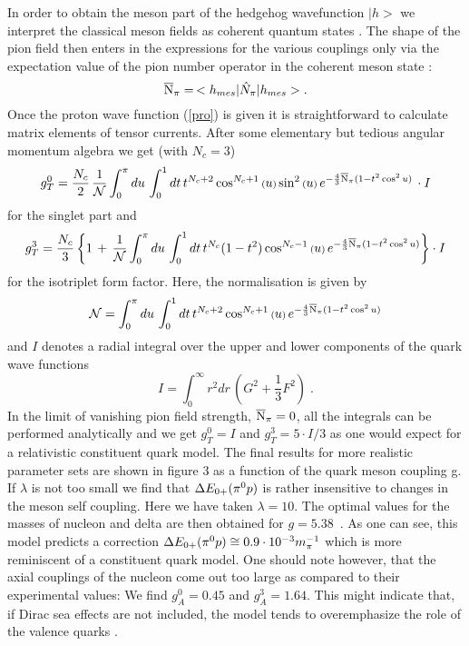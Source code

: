 In order to obtain the meson part of the hedgehog wavefunction
$|h>$ we interpret the classical meson fields as coherent quantum 
states \cite{Bi2}. The shape of the pion field then enters in the 
expressions for the various couplings only via the expectation value of the 
pion number operator in the coherent meson state \cite{Sch} :
\begin{equation}
\label{Npi}
\overline{{\rm N}}_{\pi} =\, <h_{mes}|\hat{N}_{\pi}|h_{mes}>.
\end{equation}
Once the proton wave function (\ref{pro}) is given it is straightforward to
calculate matrix elements of tensor currents. After some elementary but
tedious angular momentum algebra we get (with $N_c=3$)
\newcommand{\kl}{\scriptstyle}
\begin{equation}
\label{G1L}
g_T^{0} = \frac{N_c}{2}\,\frac{1}{{\cal N}}
\int_0^{\pi}du\,\int_0^1 dt\,t^{N_c +2}\cos^{N_c +1}{\kl (}u{\kl )}\sin^2
{\kl (}u{\kl )}
\,e^{-\frac{4}{3}\overline{{\rm N}}_{\pi}(1-t^2 \cos^2 u)}\,\cdot I
\end{equation}
for the singlet part and 
\begin{equation}
\label{G3L}
g_T^{3} =  \frac{N_c}{3} \left\{ 1\,+\, \frac{1}{{\cal N}}
\int_0^{\pi} du\, \int_0^1 dt\, t^{N_c}(1-t^2 )\cos^{N_c -1}{\kl (}u{\kl )}
\,e^{-\frac{4}{3}\overline{{\rm N}}_{\pi}(1-t^2 \cos^2 u)} \right\}\cdot I
\end{equation}
for the isotriplet form factor. Here, the normalisation is given by
\begin{equation}
\label{Nor}
{\cal N} = \int_0^{\pi} du\, \int_0^1 dt\, t^{N_c +2}\cos^{N_c +1}{\kl(}u{\kl)}
\,e^{-\frac{4}{3}\overline{{\rm N}}_{\pi}(1-t^2 \cos^2 u)}  
\end{equation}
and $I$ denotes a radial integral over the upper and lower components of
the quark wave functions
\begin{equation}
\label{red}
I=\int_0^{\infty} r^2 dr\, ( G^2 +\frac{1}{3} F^2 )\;.
\end{equation}
In the limit of vanishing pion field strength, $\overline{{\rm N}}_{\pi}=0$, 
all the integrals can be performed analytically and we get $g_T^{0}= I$
and $g_T^{3}=5\cdot I/3$ as one would expect for a relativistic
constituent quark model. The final results for more realistic parameter
sets are shown in figure 3 as a function of the quark meson coupling g.
If $\lambda$ is not too small we find that $\Delta E_{0+}(\pi^0 p)$ is rather
 insensitive to changes
in the meson self coupling. Here we have taken $\lambda=10$. The
optimal values for the masses of nucleon and delta are then obtained
for $g= 5.38$\ .  
As one can see, this model predicts a correction  $\Delta E_{0+}(\pi^0 p)
\cong 0.9\cdot 10^{-3}m_{\pi}^{-1}$ which is more reminiscent of a constituent quark model. One
should note however, that the axial couplings of the nucleon come out
too large as compared to their experimental values: We find 
$g_A^0=0.45$ and $g_A^3=1.64$. This might indicate 
that, if Dirac sea effects are not included, the model tends to 
overemphasize the role of the valence quarks \cite{Wak}.

